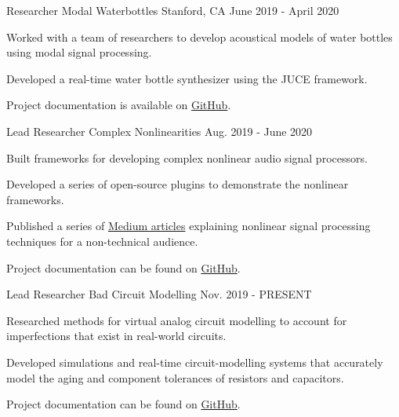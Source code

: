 \begin{cventries}
  \cventry
    {Researcher} %
    {Modal Waterbottles} %
    {Stanford, CA} %
    {June 2019 - April 2020} %
    {
      \begin{cvitems} %
        \item {Worked with a team of researchers to develop acoustical
               models of water bottles using modal signal processing.}
        \item {Developed a real-time water bottle synthesizer using the JUCE framework.}
        \item {Project documentation is available on \href{https://github.com/jatinchowdhury18/modal-waterbottles}{GitHub}.}
      \end{cvitems}
    }

  \cventry
    {Lead Researcher} %
    {Complex Nonlinearities} %
    {} %
    {Aug. 2019 - June 2020} %
    {
      \begin{cvitems} %
        \item {Built frameworks for developing complex nonlinear audio signal processors.}
        \item {Developed a series of open-source plugins to demonstrate the nonlinear frameworks.}
        \item {Published a series of \href{https://medium.com/@jatinchowdhury18/complex-nonlinearities-episode-0-why-4ad9b3eed60f}{Medium articles}
               explaining nonlinear signal processing techniques for a non-technical audience.}
        \item {Project documentation can be found on \href{https://github.com/jatinchowdhury18/ComplexNonlinearities}{GitHub}.}
      \end{cvitems}
    }

  \cventry
    {Lead Researcher} %
    {Bad Circuit Modelling} %
    {} %
    {Nov. 2019 - PRESENT} %
    {
        \begin{cvitems}
              \item{Researched methods for virtual analog circuit modelling
                    to account for imperfections that exist in real-world circuits.}
              \item{Developed simulations and real-time circuit-modelling systems that
                    accurately model the aging and component tolerances of resistors and capacitors.}
              \item{Project documentation can be found on \href{https://github.com/jatinchowdhury18/Bad-Circuit-Modelling}{GitHub}.}
        \end{cvitems}
    }


\end{cventries}
